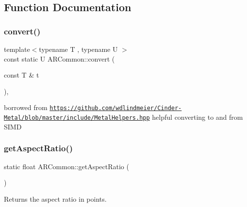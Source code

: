 \subsection{Function Documentation}
\mbox{\label{namespace_a_r_common_ab67b42b84c068f0c4ab2401ea3af86c6}} 
\subsubsection{\texorpdfstring{convert()}{convert()}}
{\footnotesize\ttfamily template$<$typename T , typename U $>$ \\
const static U A\+R\+Common\+::convert (\begin{DoxyParamCaption}\item[{const T \&}]{t }\end{DoxyParamCaption})\hspace{0.3cm}{\ttfamily [inline]}, {\ttfamily [static]}}

borrowed from \href{https://github.com/wdlindmeier/Cinder-Metal/blob/master/include/MetalHelpers.hpp}{\tt https\+://github.\+com/wdlindmeier/\+Cinder-\/\+Metal/blob/master/include/\+Metal\+Helpers.\+hpp} helpful converting to and from S\+I\+MD \mbox{\label{namespace_a_r_common_a5c33a5f3620614da8b3be53f6811d7ca}} 
\subsubsection{\texorpdfstring{get\+Aspect\+Ratio()}{getAspectRatio()}}
{\footnotesize\ttfamily static float A\+R\+Common\+::get\+Aspect\+Ratio (\begin{DoxyParamCaption}{ }\end{DoxyParamCaption})\hspace{0.3cm}{\ttfamily [static]}}



Returns the aspect ratio in points. 

\mbox{\label{namespace_a_r_common_a37407572659749170d1906046fa1921c}} 
